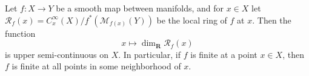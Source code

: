Let $f: X \to Y$ be a smooth map between manifolds, and for $x \in X$ let $\mathcal{R}_f(x) = C_x^\infty(X) / f^*(\mathcal{M}_{f(x)}(Y))$ be the local ring of $f$ at $x$. Then the function
$$x \mapsto \dim_{\mathbf{R}} \mathcal{R}_f(x)$$
is upper semi-continuous on $X$. In particular, if $f$ is finite at a point $x \in X$, then $f$ is finite at all points in some neighborhood of $x$.
